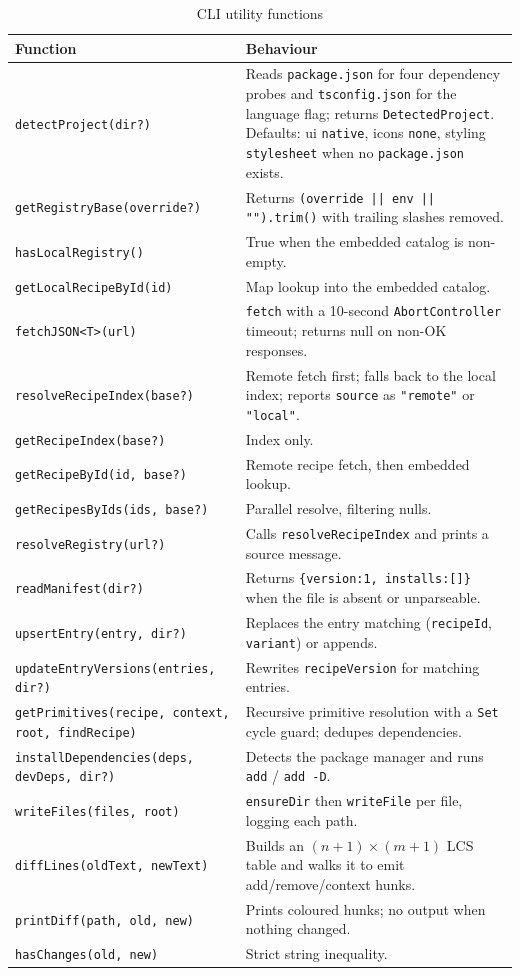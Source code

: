 \begin{longtable}{p{4.2cm}p{9.8cm}}
\caption{CLI utility functions}\\
\toprule
\textbf{Function} & \textbf{Behaviour} \\
\midrule

\texttt{detectProject(dir?)} & Reads \texttt{package.json} for four dependency
probes and \texttt{tsconfig.json} for the language flag; returns
\texttt{DetectedProject}. Defaults: ui \texttt{native}, icons \texttt{none},
styling \texttt{stylesheet} when no \texttt{package.json} exists. \\
\texttt{getRegistryBase(override?)} & Returns \texttt{(override || env || "").trim()}
with trailing slashes removed. \\
\texttt{hasLocalRegistry()} & True when the embedded catalog is non-empty. \\
\texttt{getLocalRecipeById(id)} & Map lookup into the embedded catalog. \\
\texttt{fetchJSON<T>(url)} & \texttt{fetch} with a 10-second \texttt{AbortController}
timeout; returns null on non-OK responses. \\
\texttt{resolveRecipeIndex(base?)} & Remote fetch first; falls back to the local
index; reports \texttt{source} as \texttt{"remote"} or \texttt{"local"}. \\
\texttt{getRecipeIndex(base?)} & Index only. \\
\texttt{getRecipeById(id, base?)} & Remote recipe fetch, then embedded lookup. \\
\texttt{getRecipesByIds(ids, base?)} & Parallel resolve, filtering nulls. \\
\texttt{resolveRegistry(url?)} & Calls \texttt{resolveRecipeIndex} and prints a
source message. \\
\texttt{readManifest(dir?)} & Returns \texttt{\{version:1, installs:[]\}} when the file
is absent or unparseable. \\
\texttt{upsertEntry(entry, dir?)} & Replaces the entry matching
(\texttt{recipeId}, \texttt{variant}) or appends. \\
\texttt{updateEntryVersions(entries, dir?)} & Rewrites \texttt{recipeVersion} for
matching entries. \\
\texttt{getPrimitives(recipe, context, root, findRecipe)} & Recursive primitive
resolution with a \texttt{Set} cycle guard; dedupes dependencies. \\
\texttt{installDependencies(deps, devDeps, dir?)} & Detects the package manager and
runs \texttt{add} / \texttt{add -D}. \\
\texttt{writeFiles(files, root)} & \texttt{ensureDir} then \texttt{writeFile} per
file, logging each path. \\
\texttt{diffLines(oldText, newText)} & Builds an $(n+1)\times(m+1)$ LCS table and
walks it to emit add/remove/context hunks. \\
\texttt{printDiff(path, old, new)} & Prints coloured hunks; no output when nothing
changed. \\
\texttt{hasChanges(old, new)} & Strict string inequality. \\
\bottomrule
\end{longtable}

